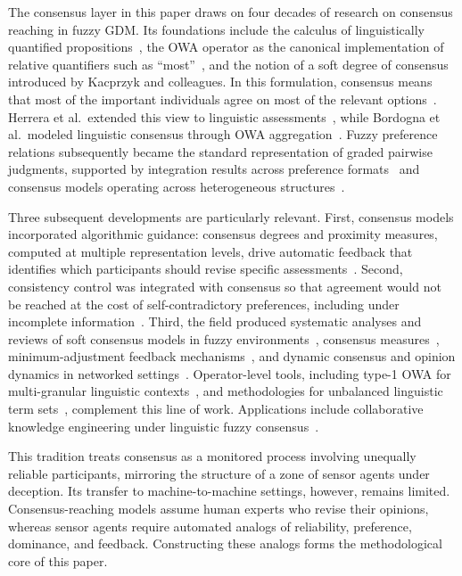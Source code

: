 \documentclass[smartcities,article,submit,moreauthors]{Definitions/mdpi}
\begin{document}
The consensus layer in this paper draws on four decades of research on
consensus reaching in fuzzy GDM. Its foundations include the calculus of
linguistically quantified propositions~\cite{zadeh1983}, the OWA operator
as the canonical implementation of relative quantifiers such as
``most''~\cite{yager1988}, and the notion of a soft degree of consensus
introduced by Kacprzyk and colleagues. In this formulation, consensus
means that most of the important individuals agree on most of the
relevant options~\cite{kacprzyk1986,kacprzyk1988,kacprzyk1992}. Herrera
et al.\ extended this view to linguistic assessments~\cite{herrera1996},
while Bordogna et al.\ modeled linguistic consensus through OWA
aggregation~\cite{bordogna1997}. Fuzzy preference relations subsequently
became the standard representation of graded pairwise judgments, supported
by integration results across preference formats~\cite{chiclana1998} and
consensus models operating across heterogeneous
structures~\cite{herreraviedma2002}.

Three subsequent developments are particularly relevant. First,
consensus models incorporated algorithmic guidance: consensus degrees and
proximity measures, computed at multiple representation levels, drive
automatic feedback that identifies which participants should revise
specific assessments~\cite{herreraviedma2002,cabrerizo2009}. Second,
consistency control was integrated with consensus so that agreement would
not be reached at the cost of self-contradictory preferences, including
under incomplete information~\cite{herreraviedma2007,cabrerizo2010kbs}.
Third, the field produced systematic analyses and reviews of soft
consensus models in fuzzy environments~\cite{herreraviedma2014,cabrerizo2010soft,
cabrerizo2015}, consensus measures~\cite{delmoral2018},
minimum-adjustment feedback mechanisms~\cite{zhang2020feedback}, and
dynamic consensus and opinion dynamics in networked
settings~\cite{hassani2022}. Operator-level tools, including type-1 OWA
for multi-granular linguistic contexts~\cite{mata2014}, and
methodologies for unbalanced linguistic term
sets~\cite{herrera2008unbalanced}, complement this line of work.
Applications include collaborative knowledge engineering under
linguistic fuzzy consensus~\cite{demaio2017}.

This tradition treats consensus as a monitored process involving
unequally reliable participants, mirroring the structure of a zone of
sensor agents under deception. Its transfer to machine-to-machine
settings, however, remains limited. Consensus-reaching models assume
human experts who revise their opinions, whereas sensor agents require
automated analogs of reliability, preference, dominance, and feedback.
Constructing these analogs forms the methodological core of this paper.
\end{document}
